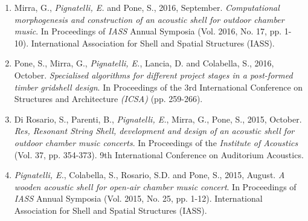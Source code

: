\begin{publications}
\begin{enumerate}[leftmargin=0.45cm, itemsep=0em, topsep=0.5em, parsep=0.2em]
        \item Mirra, G., \emph{Pignatelli, E.} and Pone, S., 2016, September. \textit{Computational morphogenesis and construction of an acoustic shell for outdoor chamber music}. In Proceedings of \emph{IASS} Annual Symposia (Vol. 2016, No. 17, pp. 1-10). International Association for Shell and Spatial Structures (IASS).
        \item Pone, S., Mirra, G., \emph{Pignatelli, E.}, Lancia, D. and Colabella, S., 2016, October. \textit{Specialised algorithms for different project stages in a post-formed timber gridshell design}. In Proceedings of the 3rd International Conference on Structures and Architecture \emph{(ICSA)} (pp. 259-266).
        \item Di Rosario, S., Parenti, B., \emph{Pignatelli, E.}, Mirra, G., Pone, S., 2015, October. \textit{Res, Resonant String Shell, development and design of an acoustic shell for outdoor chamber music concerts}. In Proceedings of the \emph{Institute of Acoustics} (Vol. 37, pp. 354-373). 9th International Conference on Auditorium Acoustics.
        \item \emph{Pignatelli, E.}, Colabella, S., Rosario, S.D. and Pone, S., 2015, August. \textit{A wooden acoustic shell for open-air chamber music concert}. In Proceedings of \emph{IASS} Annual Symposia (Vol. 2015, No. 25, pp. 1-12). International Association for Shell and Spatial Structures (IASS).
    \end{enumerate}
\end{publications}
